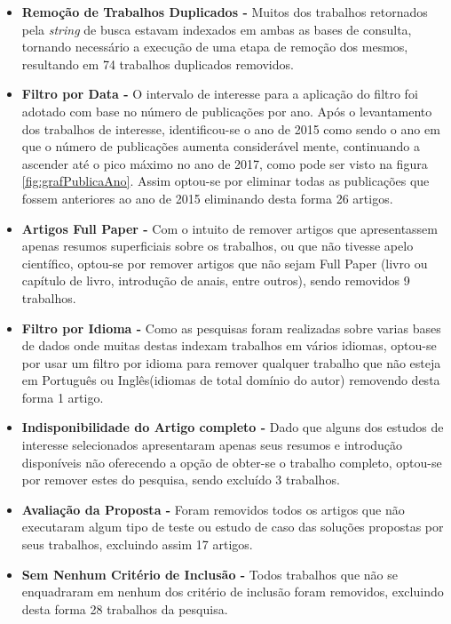 \documentclass[tid,table]{texufpel} %
\begin{document}
\begin{itemize}
	\item  \textbf{Remoção de Trabalhos Duplicados - } Muitos dos trabalhos retornados pela \textit{string} de busca estavam indexados em ambas as bases de consulta, tornando necessário a execução de uma etapa de remoção dos mesmos, resultando em 74 trabalhos duplicados removidos.
	
	\item  \textbf{Filtro por Data - } O intervalo de interesse para a aplicação do filtro foi adotado com base no número de publicações por ano. Após o levantamento dos trabalhos de interesse, identificou-se o ano de 2015 como sendo o ano em que o número de publicações aumenta considerável mente, continuando a ascender até o pico máximo no ano de 2017, como pode ser visto na figura \ref{fig:grafPublicaAno}. Assim optou-se por eliminar todas as publicações que fossem anteriores ao ano de 2015 eliminando desta forma 26 artigos.	
	
	\item  \textbf{Artigos Full Paper - } Com o intuito de remover artigos que apresentassem apenas resumos superficiais sobre os trabalhos, ou que não tivesse apelo científico, optou-se por remover artigos que não sejam Full Paper (livro ou capítulo de livro, introdução de anais, entre outros), sendo removidos 9 trabalhos.
	
	\item  \textbf{Filtro por Idioma - } Como as pesquisas foram realizadas sobre varias bases de dados onde muitas destas indexam trabalhos em vários idiomas, optou-se por usar um filtro por idioma para remover qualquer trabalho que não esteja em Português ou Inglês(idiomas de total domínio do autor) removendo desta forma 1 artigo.
	
	\item  \textbf{Indisponibilidade do Artigo completo - } Dado que alguns dos estudos de interesse selecionados apresentaram apenas seus resumos e introdução disponíveis não oferecendo a opção de obter-se o trabalho completo, optou-se por remover estes do pesquisa, sendo excluído 3 trabalhos.
	
	\item  \textbf{Avaliação da Proposta - } Foram removidos todos os artigos que não executaram algum tipo de teste ou estudo de caso das soluções propostas por seus trabalhos, excluindo assim 17 artigos.
	
	\item  \textbf{Sem Nenhum Critério de Inclusão - } Todos trabalhos que não  se enquadraram em nenhum dos critério de inclusão foram removidos, excluindo desta forma 28 trabalhos da pesquisa.	

\end{itemize}
\end{document}
